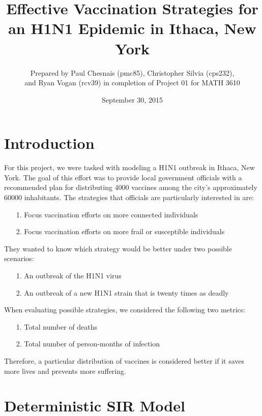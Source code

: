 \documentclass[titlepage]{article}
\title{Effective Vaccination Strategies for an H1N1 Epidemic in Ithaca, New York}
\author{Prepared by Paul Chesnais (pmc85), Christopher Silvia (cps232), \\ and Ryan Vogan (rcv39) in completion of Project 01 for MATH 3610}
\date{September 30, 2015}
\begin{document}
\maketitle
\thispagestyle{fancy}

\section{Introduction}
	For this project, we were tasked with modeling a H1N1 outbreak in Ithaca, New York. The goal of this effort was to provide local government officials with a recommended plan for distributing 4000 vaccines among the city's approximately 60000 inhabitants. The strategies that officials are particularly interested in are:
	\begin{itemize}
		\item[1.]
			Focus vaccination efforts on more connected individuals
		\item[2.]
			Focus vaccination efforts on more frail or susceptible individuals
	\end{itemize}
	They wanted to know which strategy would be better under two possible scenarios:
	\begin{itemize}
		\item[1.]
			An outbreak of the H1N1 virus
		\item[2.]
			An outbreak of a new H1N1 strain that is twenty times as deadly
	\end{itemize}
	When evaluating possible strategies, we considered the following two metrics:
	\begin{itemize}
		\item[1.]
			Total number of deaths
		\item[2.]
			Total number of person-months of infection
	\end{itemize}
	Therefore, a particular distribution of vaccines is considered better if it saves more lives and prevents more suffering.

\section{Deterministic SIR Model}
\end{document}
